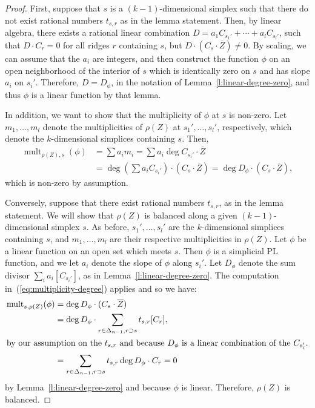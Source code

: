 \documentclass[11pt,reqno]{amsart}
\theoremstyle{definition}
\newcommand{\mult}{\operatorname{mult}}
\begin{document}
\begin{proof}
First, suppose that $s$ is a $(k-1)$-dimensional simplex such that there do not
exist rational numbers $t_{s,r}$ as in the lemma statement. Then, by linear
algebra, there exists a rational linear combination $D = a_1 C_{s_1'} + \cdots +
a_l C_{s_l'}$, such that $D \cdot C_r = 0$ for all ridges $r$ containing $s$, but
$D \cdot (C_s \cdot \overline Z) \neq 0$. By scaling, we can assume that the
$a_i$ are integers, and then construct the function $\phi$ on an open
neighborhood of the interior of $s$ which is identically zero on $s$ and has
slope $a_i$ on $s_i'$. Therefore, $D = D_\phi$, in the notation of
Lemma~\ref{l:linear-degree-zero}, and thus $\phi$ is a linear function by that
lemma.

In addition, we want to show that the multiplicity of $\phi$ at $s$ is non-zero.
Let $m_1, \ldots, m_l$ denote the multiplicities of $\rho(Z)$ at $s_1', \ldots,
s_l'$, respectively, which denote the $k$-dimensional simplices containing $s$.
Then,
\begin{equation}\label{eq:multiplicity-degree}
\begin{split}
\mult_{\rho(Z),s}(\phi) &= \sum a_i m_i
= \sum a_i \deg C_{s_i'} \cdot \overline Z \\
&= \deg \left( \sum a_i C_{s_i'} \right) \cdot (C_s \cdot \overline Z) 
= \deg D_\phi \cdot (C_s \cdot \overline Z), 
\end{split}
\end{equation}
which is non-zero by assumption.

Conversely, suppose that there exist rational numbers $t_{s,r}$, as in the lemma
statement.
We will show that
$\rho(Z)$ is balanced along a given $(k-1)$-dimensional simplex $s$. As before,
$s_1', \ldots, s_l'$ are the $k$-dimensional simplices containing $s$, and $m_1,
\ldots, m_l$ are their
respective multiplicities in $\rho(Z)$. Let $\phi$ be a linear function on an
open set which meets $s$. Then $\phi$ is a simplicial PL function, and we let
$a_i$ denote the slope of $\phi$ along $s_i'$. Let $D_\phi$ denote the sum
divisor $\sum_i a_i [C_{s_i'}]$, as in Lemma~\ref{l:linear-degree-zero}. The
computation in~(\ref{eq:multiplicity-degree}) applies and so we have:
\begin{align*}
\mult_{s, \rho(Z)}(\phi)
&= \deg D_\phi \cdot (C_s \cdot \overline Z) \\
&= \deg D_\phi \cdot \sum_{r \in \Delta_{n-1}, r \supset s} t_{s,r} [C_{r}], \\
\intertext{by our assumption on the $t_{s,r}$ and because $D_\phi$ is a linear
combination of the~$C_{s_i'}$.}
&= \sum_{r \in \Delta_{n-1}, r \supset s} t_{s,r} \deg D_\phi \cdot C_{r} = 0
\end{align*}
by Lemma~\ref{l:linear-degree-zero} and because $\phi$ is linear. Therefore,
$\rho(Z)$ is balanced.
\end{proof}
\end{document}
